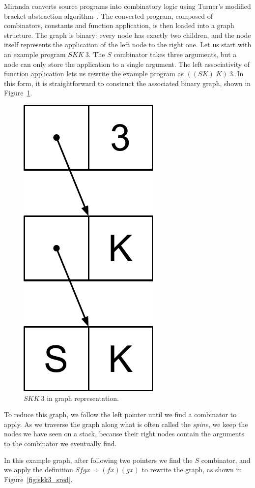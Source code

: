 \documentclass[conference]{IEEEtran}
\begin{document}
Miranda converts source programs into combinatory logic using Turner's modified bracket abstraction algorithm~\cite{turner_another_1979}.
The converted program, composed of combinators, constants and function application, is then loaded into a graph structure.
The graph is binary: every node has exactly two children, and the node itself represents the application of the left node to the right one.
Let us start with an example program $SKK \ 3$.
The $S$ combinator takes three arguments, but a node can only store the application to a single argument.
The left associativity of function application lets us rewrite the example program as $((SK) \; K)\ 3$.
In this form, it is straightforward to construct the associated binary graph, shown in Figure~\ref{fig:skk3}.

\begin{figure}
    \includegraphics[width=.15\columnwidth]{skk3}
    \centering
    \caption{$SKK \ 3$ in graph representation.}
    \label{fig:skk3}
\end{figure}

To reduce this graph, we follow the left pointer until we find a combinator to apply.
As we traverse the graph along what is often called the \textit{spine}, we keep the nodes we have seen on a stack, because their right nodes contain the arguments to the combinator we eventually find.

In this example graph, after following two pointers we find the $S$ combinator, and we apply the definition $S f g x \Rightarrow (f x) (g x)$ to rewrite the graph, as shown in Figure~\ref{fig:skk3_sred}.
\end{document}

